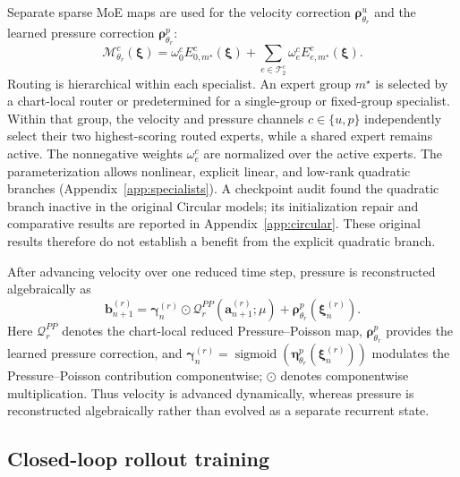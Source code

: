 Separate sparse MoE maps are used for the velocity correction $\bm\rho^u_{\theta_r}$ and the learned pressure correction $\bm\rho^p_{\theta_r}$:
\begin{equation}
  \mathcal M^c_{\theta_r}(\bm\xi)=
  \omega^c_0 E^c_{0,m^\star}(\bm\xi)+
  \sum_{e\in\mathcal T_2^c}\omega^c_e E^c_{e,m^\star}(\bm\xi).
  \label{eq:main_inner_moe}
\end{equation}
Routing is hierarchical within each specialist. An expert group $m^\star$ is selected by a chart-local router or predetermined for a single-group or fixed-group specialist. Within that group, the velocity and pressure channels $c\in\{u,p\}$ independently select their two highest-scoring routed experts, while a shared expert remains active. The nonnegative weights $\omega_e^c$ are normalized over the active experts. The parameterization allows nonlinear, explicit linear, and low-rank quadratic branches (Appendix~\ref{app:specialists}). A checkpoint audit found the quadratic branch inactive in the original Circular models; its initialization repair and comparative results are reported in Appendix~\ref{app:circular}. These original results therefore do not establish a benefit from the explicit quadratic branch.

After advancing velocity over one reduced time step, pressure is reconstructed algebraically as
\begin{equation}
  \bm b_{n+1}^{(r)}
  =\bm\gamma_n^{(r)}\odot\mathcal Q_r^{PP}(\bm a_{n+1}^{(r)};\mu)
  +\bm\rho^p_{\theta_r}(\bm\xi_n^{(r)}).
  \label{eq:main_pressure_closure}
\end{equation}
Here $\mathcal Q_r^{PP}$ denotes the chart-local reduced Pressure--Poisson map, $\bm\rho^p_{\theta_r}$ provides the learned pressure correction, and $\bm\gamma_n^{(r)} =\operatorname{sigmoid}(\bm\eta^p_{\theta_r}(\bm\xi_n^{(r)}))$ modulates the Pressure--Poisson contribution componentwise; $\odot$ denotes componentwise multiplication. Thus velocity is advanced dynamically, whereas pressure is reconstructed algebraically rather than evolved as a separate recurrent state.


\subsection{Closed-loop rollout training}

